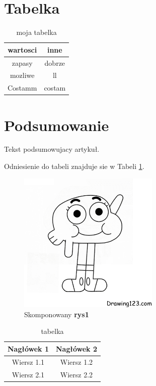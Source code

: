 \documentclass{article}
\begin{document}
\section{Tabelka}

\begin{table}[ht]
  \centering
  \begin{tabular}{|c|c|}
    \hline
    wartosci & inne \\
    \hline
    zapasy & dobrze \\
    \hline
    mozliwe & ll \\
    \hline
     Costamm & costam \\
    \hline
  \end{tabular}
  \caption{moja tabelka}
   \label{tab:tabelka1}
\end{table}

\section{Podsumowanie}

Tekst podsumowujacy artykuł.

Odniesienie do tabeli znajduje sie w Tabeli \ref{tab:tabelka1}.

    \lipsum[1]
  \begin{figure}[h]
  \centering
  \includegraphics[width=0.6\textwidth]{rys2.png}
  \caption{Skomponowany \textbf{rys1}}
  \label{opis: }
\end{figure}

    \begin{table}[h]
        \centering
        \begin{tabular}{|c|c|}
            \hline
            Nagłówek 1 & Nagłówek 2 \\
            \hline
            Wiersz 1.1 & Wiersz 1.2 \\
            Wiersz 2.1 & Wiersz 2.2 \\
            \hline
        \end{tabular}
        \caption{tabelka}
        \label{tab:tabelka2}
    \end{table}
\end{document}
